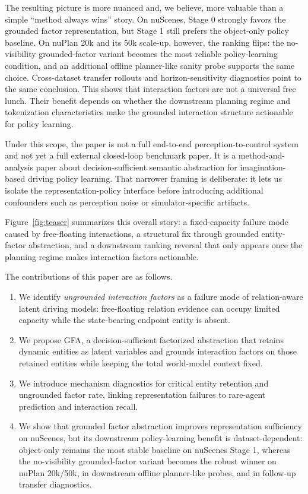 \documentclass[journal]{IEEEtran}
\newcommand{\method}{\textsc{GFA}}
\begin{document}
The resulting picture is more nuanced and, we believe, more valuable than a simple ``method always wins'' story. On nuScenes, Stage 0 strongly favors the grounded factor representation, but Stage 1 still prefers the object-only policy baseline. On nuPlan 20k and its 50k scale-up, however, the ranking flips: the no-visibility grounded-factor variant becomes the most reliable policy-learning condition, and an additional offline planner-like sanity probe supports the same choice. Cross-dataset transfer rollouts and horizon-sensitivity diagnostics point to the same conclusion. This shows that interaction factors are not a universal free lunch. Their benefit depends on whether the downstream planning regime and tokenization characteristics make the grounded interaction structure actionable for policy learning.

Under this scope, the paper is not a full end-to-end perception-to-control system and not yet a full external closed-loop benchmark paper. It is a method-and-analysis paper about decision-sufficient semantic abstraction for imagination-based driving policy learning. That narrower framing is deliberate: it lets us isolate the representation-policy interface before introducing additional confounders such as perception noise or simulator-specific artifacts.

Figure~\ref{fig:teaser} summarizes this overall story: a fixed-capacity failure mode caused by free-floating interactions, a structural fix through grounded entity-factor abstraction, and a downstream ranking reversal that only appears once the planning regime makes interaction factors actionable.

The contributions of this paper are as follows.
\begin{enumerate}
\item We identify \emph{ungrounded interaction factors} as a failure mode of relation-aware latent driving models: free-floating relation evidence can occupy limited capacity while the state-bearing endpoint entity is absent.
\item We propose \method, a decision-sufficient factorized abstraction that retains dynamic entities as latent variables and grounds interaction factors on those retained entities while keeping the total world-model context fixed.
\item We introduce mechanism diagnostics for critical entity retention and ungrounded factor rate, linking representation failures to rare-agent prediction and interaction recall.
\item We show that grounded factor abstraction improves representation sufficiency on nuScenes, but its downstream policy-learning benefit is dataset-dependent: object-only remains the most stable baseline on nuScenes Stage 1, whereas the no-visibility grounded-factor variant becomes the robust winner on nuPlan 20k/50k, in downstream offline planner-like probes, and in follow-up transfer diagnostics.
\end{enumerate}
\end{document}
